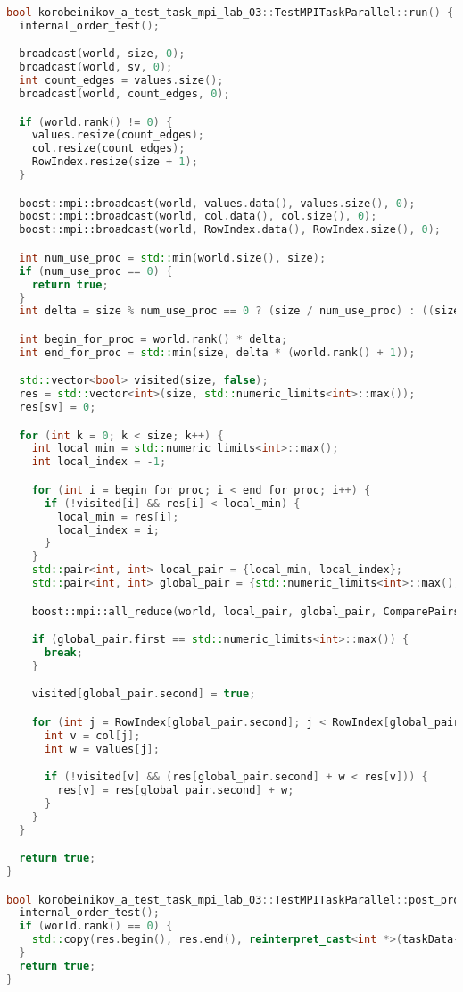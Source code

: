 \documentclass[12pt]{article}
\begin{document}
\begin{lstlisting}[language=C++]
bool korobeinikov_a_test_task_mpi_lab_03::TestMPITaskParallel::run() {
  internal_order_test();

  broadcast(world, size, 0);
  broadcast(world, sv, 0);
  int count_edges = values.size();
  broadcast(world, count_edges, 0);

  if (world.rank() != 0) {
    values.resize(count_edges);
    col.resize(count_edges);
    RowIndex.resize(size + 1);
  }

  boost::mpi::broadcast(world, values.data(), values.size(), 0);
  boost::mpi::broadcast(world, col.data(), col.size(), 0);
  boost::mpi::broadcast(world, RowIndex.data(), RowIndex.size(), 0);

  int num_use_proc = std::min(world.size(), size);
  if (num_use_proc == 0) {
    return true;
  }
  int delta = size % num_use_proc == 0 ? (size / num_use_proc) : ((size / num_use_proc) + 1);

  int begin_for_proc = world.rank() * delta;
  int end_for_proc = std::min(size, delta * (world.rank() + 1));

  std::vector<bool> visited(size, false);
  res = std::vector<int>(size, std::numeric_limits<int>::max());
  res[sv] = 0;

  for (int k = 0; k < size; k++) {
    int local_min = std::numeric_limits<int>::max();
    int local_index = -1;

    for (int i = begin_for_proc; i < end_for_proc; i++) {
      if (!visited[i] && res[i] < local_min) {
        local_min = res[i];
        local_index = i;
      }
    }
    std::pair<int, int> local_pair = {local_min, local_index};
    std::pair<int, int> global_pair = {std::numeric_limits<int>::max(), -1};

    boost::mpi::all_reduce(world, local_pair, global_pair, ComparePairs());

    if (global_pair.first == std::numeric_limits<int>::max()) {
      break;
    }

    visited[global_pair.second] = true;

    for (int j = RowIndex[global_pair.second]; j < RowIndex[global_pair.second + 1]; j++) {
      int v = col[j];
      int w = values[j];

      if (!visited[v] && (res[global_pair.second] + w < res[v])) {
        res[v] = res[global_pair.second] + w;
      }
    }
  }

  return true;
}

bool korobeinikov_a_test_task_mpi_lab_03::TestMPITaskParallel::post_processing() {
  internal_order_test();
  if (world.rank() == 0) {
    std::copy(res.begin(), res.end(), reinterpret_cast<int *>(taskData->outputs[0]));
  }
  return true;
}
\end{lstlisting}
\end{document}
